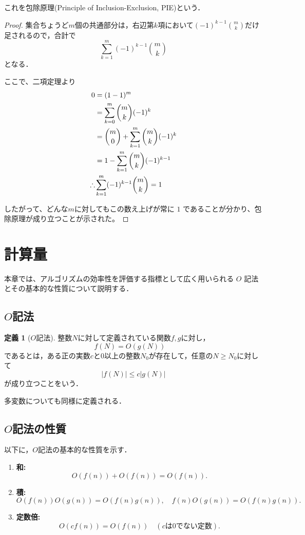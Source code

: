 \documentclass{jsreport}
\theoremstyle{plain} %
\theoremstyle{definition}
\newtheorem{definition}{定義}
\begin{document}
これを包除原理(Principle of Inclusion-Exclusion, PIE)という．

\begin{proof}
集合ちょうど$m$個の共通部分は，右辺第$k$項において$(-1)^{k-1}\binom{m}{k}$だけ足されるので，合計で
\[
\sum_{k=1}^m (-1)^{k-1} \binom{m}{k}
\]
となる．

ここで、二項定理より
\begin{align}
    0 &= (1 - 1)^m  \notag \\
    &= \sum_{k=0}^m \binom{m}{k} (-1)^k  \notag \\
    &= \binom{m}{0} + \sum_{k=1}^m \binom{m}{k} (-1)^k  \notag \\
    &= 1 - \sum_{k=1}^m \binom{m}{k} (-1)^{k-1} \notag \\
    \therefore &\sum_{k=1}^m (-1)^{k-1} \binom{m}{k} = 1\notag
\end{align}

したがって、どんな$m$に対してもこの数え上げが常に $1$ であることが分かり、包除原理が成り立つことが示された。
\end{proof}

\section{計算量}

本章では、アルゴリズムの効率性を評価する指標として広く用いられる $O$ 記法とその基本的な性質について説明する．

\subsection{$O$記法}

\begin{definition}[$O$記法]
    整数$N$に対して定義されている関数$f, g$に対し，
    \[
    f(N) = O(g(N)) \quad
    \]
    であるとは，ある正の実数$c$と0以上の整数$N_0$が存在して，任意の$N \geq N_0$に対して
    \[
    |f(N)| \leq c|g(N)|
    \]
    が成り立つことをいう．
\end{definition}

多変数についても同様に定義される．

\subsection{$O$記法の性質}

以下に，$O$記法の基本的な性質を示す．

\begin{enumerate}
    \item \textbf{和:} \[
            O(f(n)) + O(f(n)) = O(f(n)).
        \]
    \item \textbf{積:}
        \[
            O(f(n))O(g(n)) = O(f(n)g(n)), \quad f(n)O(g(n)) = O(f(n)g(n)).
        \]
    \item \textbf{定数倍:}
        \[
            O(cf(n)) = O(f(n)) \quad (cは0でない定数).
        \]
\end{enumerate}
\end{document}
